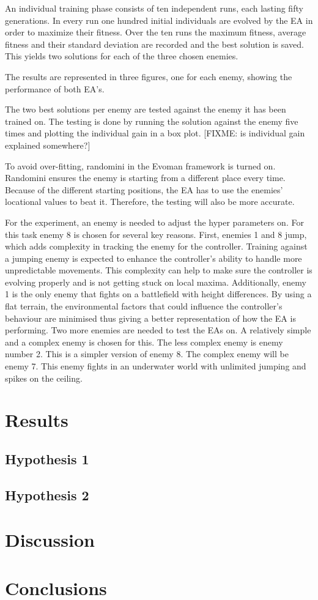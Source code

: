 An individual training phase consists of ten independent runs, each lasting fifty generations.
In every run one hundred initial individuals are evolved by the EA in order to maximize their fitness.
Over the ten runs the maximum fitness, average fitness and their standard deviation are recorded and the best solution is saved.
This yields two solutions for each of the three chosen enemies.

The results are represented in three figures, one for each enemy, showing the performance of both EA’s.

The two best solutions per enemy are tested against the enemy it has been trained on.
The testing is done by running the solution against the enemy five times and plotting the individual gain in a box plot.
[FIXME: is individual gain explained somewhere?]

To avoid over-fitting, randomini in the Evoman framework is turned on.
Randomini ensures the enemy is starting from a different place every time.
Because of the different starting positions, the EA has to use the enemies’ locational values to beat it.
Therefore, the testing will also be more accurate.

For the experiment, an enemy is needed to adjust the hyper parameters on.
For this task enemy 8 is chosen for several key reasons. First, enemies 1 and 8 jump, which adds complexity in tracking the enemy for the controller.
Training against a jumping enemy is expected to enhance the controller’s ability to handle more unpredictable movements.
This complexity can help to make sure the controller is evolving properly and is not getting stuck on local maxima.
Additionally, enemy 1 is the only enemy that fights on a battlefield with height differences.
By using a flat terrain, the environmental factors that could influence the controller’s behaviour are minimised thus giving a better representation of how the EA is performing.
Two more enemies are needed to test the EAs on. A relatively simple and a complex enemy is chosen for this.
The less complex enemy is enemy number 2.
This is a simpler version of enemy 8.
The complex enemy will be enemy 7.
This enemy fights in an underwater world with unlimited jumping and spikes on the ceiling.


\section{Results}
\subsection{Hypothesis 1}

\subsection{Hypothesis 2}

\section{Discussion}

\cite{de2016evolving}

\section{Conclusions}

